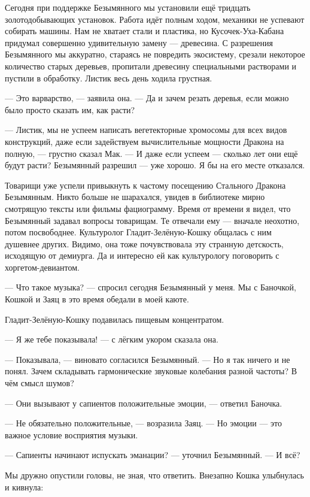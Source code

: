 Сегодня при поддержке Безымянного мы установили ещё тридцать золотодобывающих установок.
Работа идёт полным ходом, механики не успевают собирать машины.
Нам не хватает стали и пластика, но Кусочек-Уха-Кабана придумал совершенно удивительную замену --- древесина.
С разрешения Безымянного мы аккуратно, стараясь не повредить экосистему, срезали некоторое количество старых деревьев, пропитали древесину специальными растворами и пустили в обработку.
Листик весь день ходила грустная.

--- Это варварство, --- заявила она.
--- Да и зачем резать деревья, если можно было просто сказать им, как расти?

--- Листик, мы не успеем написать вегетекторные хромосомы для всех видов конструкций, даже если задействуем вычислительные мощности Дракона на полную, --- грустно сказал Мак.
--- И даже если успеем --- сколько лет они ещё будут расти?
Безымянный разрешил --- уже хорошо.
Я бы на его месте отказался.

Товарищи уже успели привыкнуть к частому посещению Стального Дракона Безымянным.
Никто больше не шарахался, увидев в библиотеке мирно смотрящую тексты или фильмы фациограмму.
Время от времени я видел, что Безымянный задавал вопросы товарищам.
Те отвечали ему --- вначале неохотно, потом посвободнее.
Культуролог Гладит-Зелёную-Кошку общалась с ним душевнее других.
Видимо, она тоже почувствовала эту странную детскость, исходящую от демиурга.
Да и интересно ей как культурологу поговорить с хоргетом-девиантом.

--- Что такое музыка? --- спросил сегодня Безымянный у меня.
Мы с Баночкой, Кошкой и Заяц в это время обедали в моей каюте.

Гладит-Зелёную-Кошку подавилась пищевым концентратом.

--- Я же тебе показывала! --- с лёгким укором сказала она.

--- Показывала, --- виновато согласился Безымянный.
--- Но я так ничего и не понял.
Зачем складывать гармонические звуковые колебания разной частоты?
В чём смысл шумов?

--- Они вызывают у сапиентов положительные эмоции, --- ответил Баночка.

--- Не обязательно положительные, --- возразила Заяц.
--- Но эмоции --- это важное условие восприятия музыки.

--- Сапиенты начинают испускать эманации? --- уточнил Безымянный.
--- И всё?

Мы дружно опустили головы, не зная, что ответить.
Внезапно Кошка улыбнулась и кивнула:

